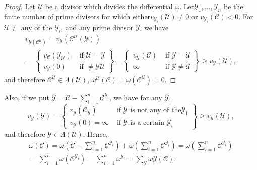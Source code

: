 \begin{proof}
  Let $ \mathscr{U} $ be a divisor which divides the differential $
  \omega $. Let\break $ \mathscr{Y}_1 , \ldots, \mathscr{Y}_n $ be the finite
  number of prime divisors for which either\break  $ v_{\mathscr{Y}_{i}}
  (\mathscr{U} ) \neq 0 $ or $ v_{\mathscr{Y}_{i}} (\mathscr{C})  < 0
  $. For $ \mathscr{U} \neq $ any of the $ \mathscr{Y}_i $, and any
  prime divisor $ \mathscr{Y} $, we have  
  \begin{multline*}
  v_{\mathscr{Y}(\mathscr{C}^{\mathscr{U}})}=v_\mathscr{Y} (
  \mathscr{C}^{\mathscr{U}} (\mathscr{Y} ))\\
  = \left. 
       \begin{cases}
          v_\mathscr{C} (\mathscr{Y}_{\mathscr{U}}) & \text{ if }
          \mathscr{U}= \mathscr{Y}\\
            v_\mathscr{Y} (0) & \text{ if } \neq
              \mathscr{Y}\mathscr{U}  
       \end{cases}\right\}
       = \left.
       \begin{cases}
        v_\mathscr{U}(\mathscr{C}) & \text{ if } \mathscr{Y} =
          \mathscr{U}\\ 
        \infty&  \text{ if } \mathscr{Y} \neq \mathscr{U}
       \end{cases}\right\}
       \ge v_\mathscr{Y} (\mathscr{U}), 
  \end{multline*}
  and therefore $ \mathscr{C}^\mathscr{U} \in  \Lambda (\mathscr{U})
  $, $ \omega^\mathscr{U} (\mathscr{C}) = \omega
  (\mathscr{C}^\mathscr{U}) = 0 $. 
\end{proof}

Also, if we put $ \mathscr{Y} = \mathscr{C} - \sum \limits^{n}_{i=1}
\mathscr{C}^{\mathscr{Y}_i} $, we have for any $\mathscr{Y} $, 
$$
v_\mathscr{Y} (\mathscr{Y}) = 
\left. \begin{cases}
   v_\mathscr{Y} (\mathscr{C}_\mathscr{Y}) & \text{ if } \mathscr{Y} \text{ is
     not any  of the}\mathscr{Y}_1\\
   v_\mathscr{Y} (0) = \infty & \text{ if } \mathscr{Y} \text{ is a
    certain } \mathscr{Y}_i
\end{cases}\right\}
 \ge v_\mathscr{Y} (\mathscr{U}),  
$$
and therefore $ \mathscr{Y} \in \Lambda  (\mathscr{U}) $. Hence,
\begin{gather*}
  \omega (\mathscr{C}) = \omega \left( \mathscr{C} - \sum^{n}_{i=1}
  \mathscr{C}^{\mathscr{Y}_i}\right) + \omega \left( \sum^{n}_{i=1}
  \mathscr{C}^{\mathscr{Y}_i}\right) = \omega \left( \sum^{n}_{i=1}
  \mathscr{C}^{\mathscr{Y}_i } \right) \\ 
  = \sum^{n}_{i=1} \omega \left( \mathscr{C}^{\mathscr{Y}_i} \right) =
  \sum^{n}_{i=1} \omega^{\mathscr{Y}_i} = \sum_{\mathscr{Y}} \omega
  \mathscr{Y} (\mathscr{C} ). \\ 
\end{gather*}


